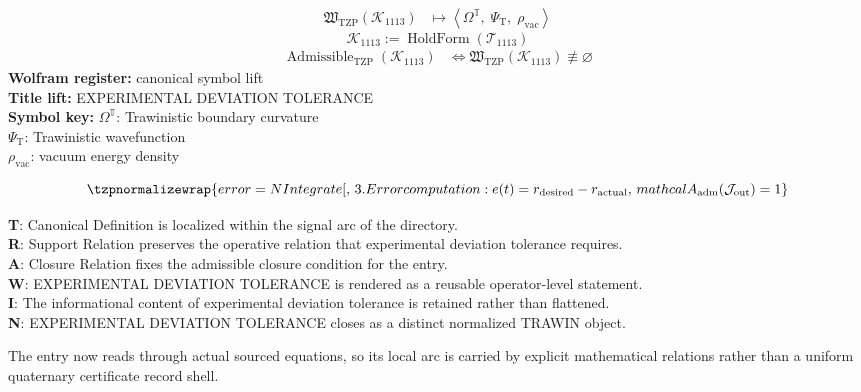 \noindent
\begin{minipage}[t]{0.48\linewidth}
\begingroup
\small
\[
\begin{aligned}
\mathfrak{W}_{\mathrm{TZP}}\!\left(\mathcal{K}_{1113}\right)
&\longmapsto
\left\langle \Omega^{\mathbb{T}},\; \Psi_{\mathrm{T}},\; \rho_{\mathrm{vac}} \right\rangle
\end{aligned}
\]
\[
\mathcal{K}_{1113}
:=
\operatorname{HoldForm}\!\left(\mathcal{T}_{1113}\right)
\]
\[
\begin{aligned}
\operatorname{Admissible}_{\mathrm{TZP}}\!\left(\mathcal{K}_{1113}\right)
&\Longleftrightarrow
\mathfrak{W}_{\mathrm{TZP}}\!\left(\mathcal{K}_{1113}\right)\not\equiv\varnothing
\end{aligned}
\]
\textbf{Wolfram register:} canonical symbol lift\\
\textbf{Title lift:} EXPERIMENTAL DEVIATION TOLERANCE\\
\textbf{Symbol key:} \(\Omega^{\mathbb{T}}\): Trawinistic boundary curvature\\ \(\Psi_{\mathrm{T}}\): Trawinistic wavefunction\\ \(\rho_{\mathrm{vac}}\): vacuum energy density
\par
\endgroup
\end{minipage}\hfill
\begin{minipage}[t]{0.48\linewidth}
\[
\tzpnormalizewrap{error = NIntegrate[,\,3. Error computation: e(t) = r_{\mathrm{desired}} - r_{\mathrm{actual}},\,mathcal{A}_{\mathrm{adm}}\!\left(\mathcal{J}_{\mathrm{out}}\right)=1}
\]

\small
\textbf{T}: Canonical Definition is localized within the signal arc of the directory.\\
\textbf{R}: Support Relation preserves the operative relation that experimental deviation tolerance requires.\\
\textbf{A}: Closure Relation fixes the admissible closure condition for the entry.\\
\textbf{W}: EXPERIMENTAL DEVIATION TOLERANCE is rendered as a reusable operator-level statement.\\
\textbf{I}: The informational content of experimental deviation tolerance is retained rather than flattened.\\
\textbf{N}: EXPERIMENTAL DEVIATION TOLERANCE closes as a distinct normalized TRAWIN object.
\normalsize
\end{minipage}

The entry now reads through actual sourced equations, so its local arc is carried by explicit mathematical relations rather than a uniform quaternary certificate record shell.
\clearpage

